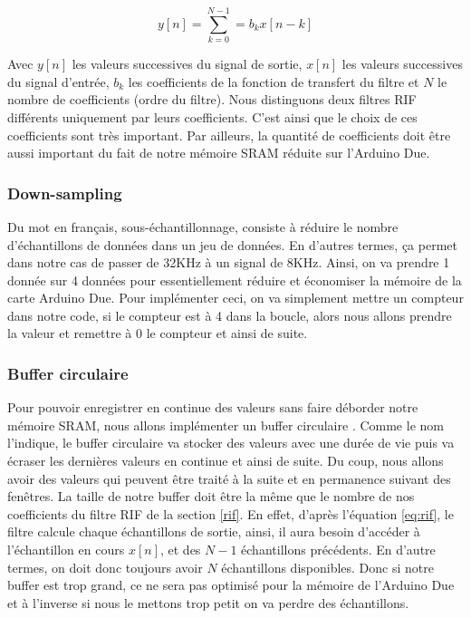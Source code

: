 \documentclass[a4paper,11pt]{article}
\begin{document}
\begin{equation} \label{eq:rif}
	y[n] = \sum_{k=0}^{N-1} = b_{k}x[n-k]
\end{equation}

Avec $y[n]$ les valeurs successives du signal de sortie, $x[n]$ les valeurs successives du signal d’entrée, $b_{k}$ les coefficients de la fonction de transfert du filtre et $N$ le nombre de coefficients (ordre du filtre). Nous distinguons deux filtres RIF différents uniquement par leurs coefficients. C'est ainsi que le choix de ces coefficients sont très important. Par ailleurs, la quantité de coefficients doit être aussi important du fait de notre mémoire SRAM réduite sur l'Arduino Due.

\subsubsection{Down-sampling} \label{ds}

Du mot en français, sous-échantillonnage, consiste à réduire le nombre d’échantillons de données dans un jeu de données. En d'autres termes, ça permet dans notre cas de passer de 32KHz à un signal de 8KHz. Ainsi, on va prendre 1 donnée sur 4 données pour essentiellement réduire et économiser la mémoire de la carte Arduino Due. Pour implémenter ceci, on va simplement mettre un compteur dans notre code, si le compteur est à 4 dans la boucle, alors nous allons prendre la valeur et remettre à 0 le compteur et ainsi de suite.

\subsubsection{Buffer circulaire} \label{buffer}

Pour pouvoir enregistrer en continue des valeurs sans faire déborder notre mémoire SRAM, nous allons implémenter un buffer circulaire \cite{buffer}. Comme le nom l'indique, le buffer circulaire va stocker des valeurs avec une durée de vie puis va écraser les dernières valeurs en continue et ainsi de suite. Du coup, nous allons avoir des valeurs qui peuvent être traité à la suite et en permanence suivant des fenêtres. La taille de notre buffer doit être la même que le nombre de nos coefficients du filtre RIF de la section \ref{rif}. En effet, d'après l'équation \ref{eq:rif}, le filtre calcule chaque échantillons de sortie, ainsi, il aura besoin d'accéder à l'échantillon en cours $x[n]$, et des $N-1$ échantillons précédents. En d'autre termes, on doit donc toujours avoir $N$ échantillons disponibles. Donc si notre buffer est trop grand, ce ne sera pas optimisé pour la mémoire de l'Arduino Due et à l'inverse si nous le mettons trop petit on va perdre des échantillons.
\end{document}
